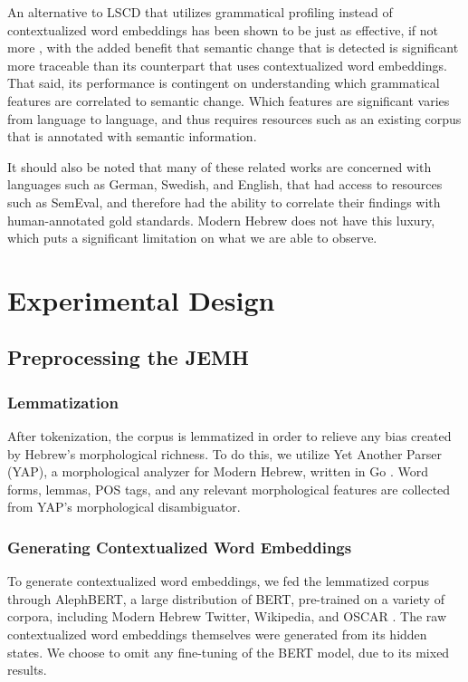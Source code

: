\documentclass[10pt, a4paper]{article}
\begin{document}
An alternative to LSCD that utilizes grammatical profiling instead of contextualized word embeddings has been shown to be just as effective, if not more \cite{grammaticalprofiling}, with the added benefit that semantic change that is detected is significant more traceable than its counterpart that uses contextualized word embeddings. That said, its performance is contingent on understanding which grammatical features are correlated to semantic change. Which features are significant varies from language to language, and thus requires resources such as an existing corpus that is annotated with semantic information.

It should also be noted that many of these related works are concerned with languages such as German, Swedish, and English, that had access to resources such as SemEval, and therefore had the ability to correlate their findings with human-annotated gold standards. Modern Hebrew does not have this luxury, which puts a significant limitation on what we are able to observe.
\section{Experimental Design}

\subsection{Preprocessing the JEMH}

\subsubsection{Lemmatization}
After tokenization, the corpus is lemmatized in order to relieve any bias created by Hebrew's morphological richness\cite{Laicher2021}. To do this, we utilize Yet Another Parser (YAP), a morphological analyzer for Modern Hebrew, written in Go \cite{yap}. Word forms, lemmas, POS tags, and any relevant morphological features are collected from YAP's morphological disambiguator. 
\subsubsection{Generating Contextualized Word Embeddings}
To generate contextualized word embeddings, we fed the lemmatized corpus through AlephBERT, a large distribution of BERT, pre-trained on a variety of corpora, including Modern Hebrew Twitter, Wikipedia, and OSCAR \cite{alephBERT}. The raw contextualized word embeddings themselves were generated from its hidden states. We choose to omit any fine-tuning of the BERT model, due to its mixed results.
\end{document}
